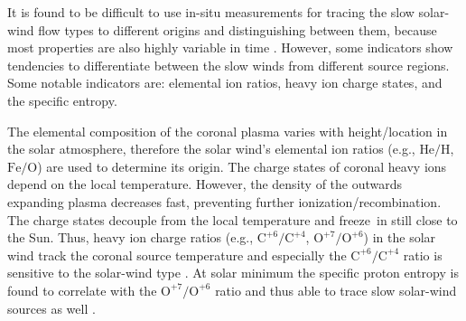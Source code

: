 It is found to be difficult to use in-situ measurements for tracing the slow solar-wind flow types to different origins and distinguishing between them, because most properties are also highly variable in time \citep{Kilpua2016}. However, some indicators show tendencies to differentiate between the slow winds from different source regions. Some notable indicators are: elemental ion ratios, heavy ion charge states, and the specific entropy.

The elemental composition of the coronal plasma varies with height/location in the solar atmosphere, therefore the solar wind's elemental ion ratios (e.g., $\text{He}/\text{H}$, $\text{Fe}/\text{O}$) are used to determine its origin.
The charge states of coronal heavy ions depend on the local temperature. However, the density of the outwards expanding plasma decreases fast, preventing further ionization/recombination. The charge states decouple from the local temperature and freeze~in still close to the Sun. Thus, heavy ion charge ratios (e.g., $\text{C}^{+6}\!/\text{C}^{+4}$, $\text{O}^{+7}\!/\text{O}^{+6}$) in the solar wind track the coronal source temperature and especially the $\text{C}^{+6}\!/\text{C}^{+4}$ ratio is sensitive to the solar-wind type \citep{Landi2012}.
At solar minimum the specific proton entropy is found to correlate with the $\text{O}^{+7}\!/\text{O}^{+6}$ ratio and thus able to trace slow solar-wind sources as well \citep{Pagel2004}.

